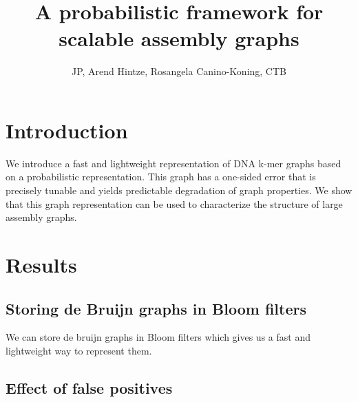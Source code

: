 \documentclass[12pt]{article} \usepackage{simplemargins}
\begin{document}
\title{A probabilistic framework for scalable assembly graphs}
\author{JP, Arend Hintze, Rosangela Canino-Koning, CTB}

\maketitle

\section{Introduction}

We introduce a fast and lightweight representation of DNA k-mer graphs
based on a probabilistic representation.  This graph has a one-sided
error that is precisely tunable and yields predictable degradation of
graph properties.  We show that this graph representation can be used
to characterize the structure of large assembly graphs.

\section{Results}

\subsection{Storing de Bruijn graphs in Bloom filters}

We can store de bruijn graphs in Bloom filters which gives us a fast and lightweight way to represent them.

\begin{figure}
\end{figure}

\subsection{Effect of false positives}
\end{document}
